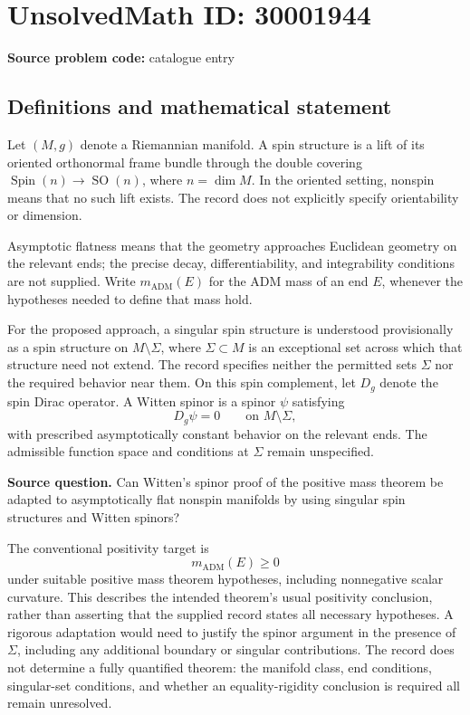 \documentclass[11pt]{article}
\begin{document}
\section*{UnsolvedMath ID: 30001944}
\textbf{Source problem code:} catalogue entry
\subsection{Definitions and mathematical statement}
Let \((M,g)\) denote a Riemannian manifold. A spin structure is a lift of its oriented orthonormal frame bundle through the double covering \(\operatorname{Spin}(n)\to\operatorname{SO}(n)\), where \(n=\dim M\). In the oriented setting, nonspin means that no such lift exists. The record does not explicitly specify orientability or dimension.

Asymptotic flatness means that the geometry approaches Euclidean geometry on the relevant ends; the precise decay, differentiability, and integrability conditions are not supplied. Write \(m_{\mathrm{ADM}}(E)\) for the ADM mass of an end \(E\), whenever the hypotheses needed to define that mass hold.

For the proposed approach, a singular spin structure is understood provisionally as a spin structure on \(M\setminus\Sigma\), where \(\Sigma\subset M\) is an exceptional set across which that structure need not extend. The record specifies neither the permitted sets \(\Sigma\) nor the required behavior near them. On this spin complement, let \(D_g\) denote the spin Dirac operator. A Witten spinor is a spinor \(\psi\) satisfying
\[
D_g\psi=0\qquad\text{on }M\setminus\Sigma,
\]
with prescribed asymptotically constant behavior on the relevant ends. The admissible function space and conditions at \(\Sigma\) remain unspecified.

\textbf{Source question.} Can Witten's spinor proof of the positive mass theorem be adapted to asymptotically flat nonspin manifolds by using singular spin structures and Witten spinors?

The conventional positivity target is
\[
m_{\mathrm{ADM}}(E)\geq 0
\]
under suitable positive mass theorem hypotheses, including nonnegative scalar curvature. This describes the intended theorem's usual positivity conclusion, rather than asserting that the supplied record states all necessary hypotheses. A rigorous adaptation would need to justify the spinor argument in the presence of \(\Sigma\), including any additional boundary or singular contributions. The record does not determine a fully quantified theorem: the manifold class, end conditions, singular-set conditions, and whether an equality-rigidity conclusion is required all remain unresolved.
\end{document}

